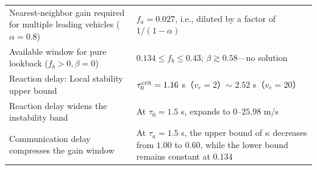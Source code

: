 \documentclass[11pt,a4paper,openany]{book}
\numberwithin{equation}{chapter}
\numberwithin{figure}{chapter}
\numberwithin{table}{chapter}
\begin{document}
\begin{center}
\begin{tabular}{p{6.4cm}p{7.4cm}}
Nearest-neighbor gain required for multiple leading vehicles ($\alpha=0.8$)




&




 $f_a=0.027$, i.e., diluted by a factor of $1/(1-\alpha)$



\\







Available window for pure lookback ($f_b>0,\beta=0$)& $0.134\le f_b\le0.43$; $\beta\gtrsim0.58$—no solution



\\
\midrule







Reaction delay: Local stability upper bound




& $\tau_0^{\rm crit}=1.16$ s（$v_e=2$）$\sim$ $2.52$ s（$v_e=20$） \\







Reaction delay widens the instability band




&




 At $\tau_0=1.5$ s, expands to $0$–$25.98$ m/s



\\







Communication delay compresses the gain window




&




 At $\tau_a=1.5$ s, the upper bound of $\kappa$ decreases from $1.00$ to $0.60$, while the lower bound remains constant at $0.134$



\\
\midrule








\end{tabular}
\end{center}
\end{document}

